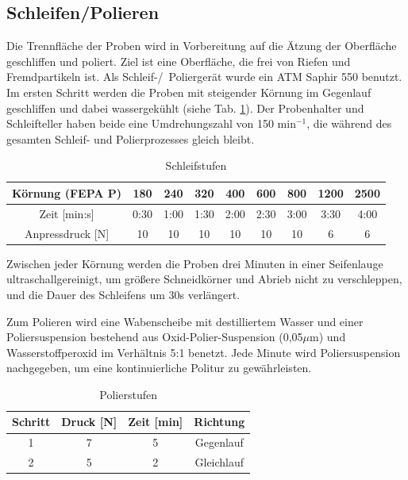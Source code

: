 \subsection*{Schleifen/Polieren}

Die Trennfläche der Proben wird in Vorbereitung auf die Ätzung der Oberfläche geschliffen und poliert. Ziel ist eine Oberfläche, die frei von Riefen und Fremdpartikeln ist. Als Schleif-/~Poliergerät wurde ein ATM Saphir 550 benutzt.
Im ersten Schritt werden die Proben mit steigender Körnung im Gegenlauf geschliffen und dabei wassergekühlt (siehe Tab. \ref{tab:Schleifstufen}). Der Probenhalter und Schleifteller haben beide eine Umdrehungszahl von 150 min$^{-1}$, die während des gesamten Schleif- und Polierprozesses gleich bleibt.   

\begin{table}[]
	\centering
	\begin{tabular}{|c|c|c|c|c|c|c|c|c|}
		
		\hline 
		Körnung (FEPA P) & 180 & 240 & 320 & 400 & 600 & 800 & 1200 & 2500 \\ 
		\hline 
		Zeit [min:s] & 0:30 & 1:00 & 1:30 & 2:00 & 2:30 & 3:00 & 3:30 & 4:00 \\ 
		\hline 
		Anpressdruck [N] & 10&10&10&10&10&10&6&6\\
		\hline
	\end{tabular} 
	\caption{Schleifstufen}
	\label{tab:Schleifstufen}
\end{table}

Zwischen jeder Körnung werden die Proben drei Minuten in einer Seifenlauge ultraschallgereinigt, um größere Schneidkörner und Abrieb nicht zu verschleppen, und die Dauer des Schleifens um 30s verlängert. 

Zum Polieren wird eine Wabenscheibe mit destilliertem Wasser und einer Poliersuspension bestehend aus Oxid-Polier-Suspension (0,05$\mu$m) und Wasserstoffperoxid im Verhältnis 5:1 benetzt. Jede Minute wird Poliersuspension nachgegeben, um eine kontinuierliche Politur zu gewährleisten.

\begin{table}[h]
	\centering
	
	\begin{tabular}{|c|c|c|c|}
		\hline 
		Schritt & Druck [N] & Zeit [min] & Richtung \\ 
		\hline 
		1 & 7 & 5 & Gegenlauf \\ 
		\hline 
		2 & 5 & 2 & Gleichlauf \\ 
		\hline 
	\end{tabular} 
	\caption{Polierstufen}
	\label{tab:Polierstufen}
\end{table}

